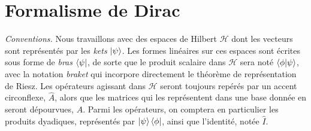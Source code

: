 \section{Formalisme de Dirac}

\textit{Conventions.} Nous travaillons avec des espaces de Hilbert $\mathcal H$ dont les vecteurs sont représentés par les \textit{kets} $\ket{\psi}$. Les formes linéaires sur ces espaces sont écrites sous forme de \textit{bras} $\bra{\psi}$, de sorte que le produit scalaire dans $\mathcal H$ sera noté $\braket{\phi}{\psi}$, avec la notation \textit{braket} qui incorpore directement le théorème de représentation de Riesz. Les opérateurs agissant dans $\mathcal H$ seront toujours repérés par un accent circonflexe, $\hat A$, alors que les matrices qui les représentent dans une base donnée en seront dépourvues, $A$. Parmi les opérateurs, on comptera en particulier les produits dyadiques, représentés par $\ket{\psi}\bra{\phi}$, ainsi que l'identité, notée $\hat I$.\\
$ $

